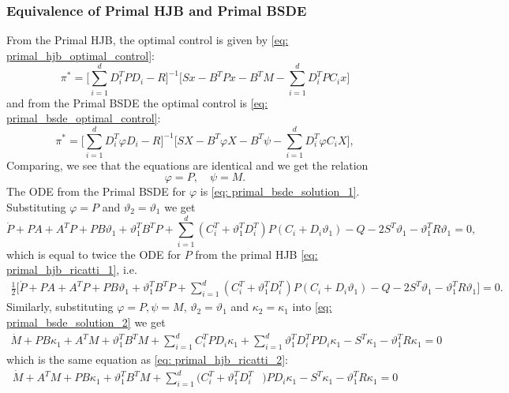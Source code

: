 \subsubsection{Equivalence of Primal HJB and Primal BSDE}
From the Primal HJB, the optimal control is given by \eqref{eq: primal_hjb_optimal_control}:
\begin{equation}
    \pi^\ast = \bigg[\sum_{i=1}^d D_i^T P D_i - R\bigg]^{-1} \bigg[S x - B^T P x - B^T M - \sum_{i=1}^d D_i^T P C_i x\bigg]
\end{equation}
and from the Primal BSDE the optimal control is \eqref{eq: primal_bsde_optimal_control}:
\begin{equation}
    \pi^\ast = \bigg[ \sum_{i=1}^d D_i^T \varphi D_i -  R \bigg]^{-1} \bigg[ S X - B^T \varphi X - B^T \psi - \sum_{i=1}^d D_i^T \varphi C_i X \bigg],
\end{equation}
Comparing, we see that the equations are identical and we get the relation
\begin{equation*}
    \varphi = P, \quad \psi = M. 
\end{equation*}
The ODE from the Primal BSDE for $\varphi$ is \eqref{eq: primal_bsde_solution_1}. Substituting $\varphi = P$ and $\vartheta_2 = \vartheta_1$ we get 
\begin{equation*}
    \dot{P} + P A + A^T P + P B \vartheta_1 + \vartheta_1^T B^T P + \sum_{i=1}^d (C_i^T + \vartheta_1^T D_i^T) P (C_i + D_i \vartheta_1) - Q - 2S^T \vartheta_1 - \vartheta_1^T R \vartheta_1  = 0,
\end{equation*}
which is equal to twice the ODE for $P$ from the primal HJB \eqref{eq: primal_hjb_ricatti_1}, i.e. 
\begin{align*}
    \frac12 \bigg[ \dot{P} + P A + A^T P + P B \vartheta_1 + \vartheta_1^T B^T P + \sum_{i=1}^d (C_i^T + \vartheta_1^T D_i^T) P (C_i + D_i \vartheta_1) - Q - 2S^T \vartheta_1 - \vartheta_1^T R \vartheta_1\bigg] = 0.
\end{align*}
Similarly, substituting $\varphi=P, \psi = M$, $\vartheta_2 = \vartheta_1$ and $\kappa_2 = \kappa_1$ into \eqref{eq: primal_bsde_solution_2} we get
\begin{align*}
    \dot{M} + P B \kappa_1 + A^T M + \vartheta_1^T B^T M + \sum_{i=1}^d C_i^T P D_i \kappa_1 + \sum_{i=1}^d \vartheta_1^T D_i^T P D_i \kappa_1 - S^T \kappa_1 - \vartheta_1^T R \kappa_1 = 0
\end{align*}
which is the same equation as \eqref{eq: primal_hjb_ricatti_2}:
\begin{align*}
    \dot{M} + A^T M + P B \kappa_1 + \vartheta_1^T B^T M + \sum_{i=1}^d (C_i^T + \vartheta_1^T D_i^T&)P D_i \kappa_1 -  S^T \kappa_1 - \vartheta_1^T R \kappa_1 = 0 
\end{align*}
